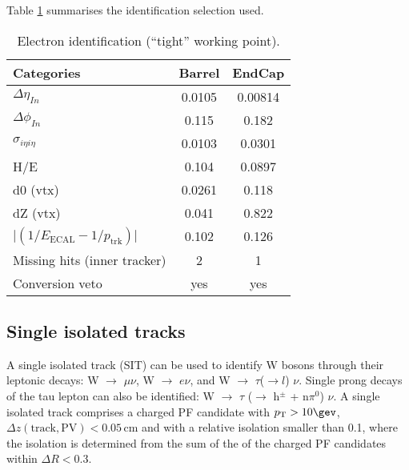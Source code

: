 Table \ref{tab:ele-id} summarises the identification 
selection used. 

\begin{table}[h!]
  \caption{Electron identification (``tight'' working point).\label{tab:ele-id}}
  \centering
  \footnotesize
  \begin{tabular}{ lcc }
    \hline
    \hline
    Categories                                               & Barrel    & EndCap    \\
    \hline
    $\Delta \eta_{In}$                                       & 0.0105   & 0.00814  \\
    $\Delta \phi_{In}$                                       & 0.115    & 0.182  \\
    $\sigma_{i\eta i\eta}$                                   & 0.0103    & 0.0301  \\
    H/E                                                      & 0.104    & 0.0897   \\
    d0 (vtx)                                                 & 0.0261    & 0.118  \\
    dZ (vtx)                                                 & 0.041    & 0.822  \\
    $\lvert(1/E_{\textrm{ECAL}} - 1/p_{\textrm{trk}})\rvert$ & 0.102     & 0.126  \\
    Missing hits (inner tracker)                             & 2         & 1         \\
    Conversion veto                                          & yes       & yes   \\
    \hline
    \hline
  \end{tabular}
  \end{table}


\subsection{Single isolated tracks}
\label{sec:SIT}
A single isolated track (SIT) can be used to identify W bosons through their leptonic decays: 
W $\rightarrow$ $\mu \nu$, W $\rightarrow$ $e\nu$, and W $\rightarrow$ $\tau$($\rightarrow l$) $\nu$. 
Single prong decays of the tau lepton can also be identified: W $\rightarrow$ $\tau$ ($\rightarrow$ h$^{\pm}$ + n$\pi^{0}$) $\nu$. 
A single isolated track comprises a charged PF candidate with $\Pt > 10 \gev$, $\Delta z(\mathrm{track}, \mathrm{PV}) < 0.05 \, \mathrm{cm}$ 
and with a relative isolation smaller than 0.1, where the isolation is determined from the sum 
of the \Pt of the charged PF candidates within $\Delta R < 0.3$.


